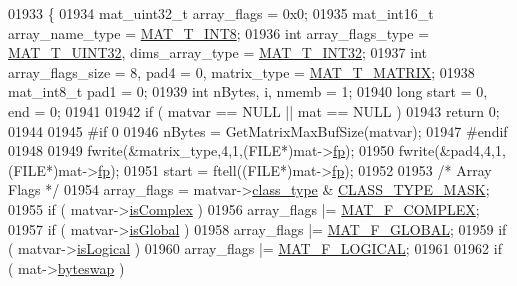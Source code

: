 \begin{DoxyCode}
{{{{{{{{{{{{{{{{01933 \{
01934     mat\_uint32\_t array\_flags = 0x0;
01935     mat\_int16\_t  array\_name\_type = \hyperlink{group___m_a_t_ggacf7b3b879282b7ab3a51190e49bf3453a9807f5033ed4f9b548953742d9fd1658}{MAT\_T\_INT8};
01936     \textcolor{keywordtype}{int}      array\_flags\_type = \hyperlink{group___m_a_t_ggacf7b3b879282b7ab3a51190e49bf3453aa397e285a23fe240368b752897652c6a}{MAT\_T\_UINT32}, dims\_array\_type = 
      \hyperlink{group___m_a_t_ggacf7b3b879282b7ab3a51190e49bf3453a83e06a68320726c6572bfbb9f3addb1d}{MAT\_T\_INT32};
01937     \textcolor{keywordtype}{int}      array\_flags\_size = 8, pad4 = 0, matrix\_type = \hyperlink{group___m_a_t_ggacf7b3b879282b7ab3a51190e49bf3453a32985fee89a4df8db4b3f5d3a48823d3}{MAT\_T\_MATRIX};
01938     mat\_int8\_t   pad1 = 0;
01939     \textcolor{keywordtype}{int}      nBytes, i, nmemb = 1;
01940     \textcolor{keywordtype}{long}     start = 0, end = 0;
01941 
01942     \textcolor{keywordflow}{if} ( matvar == NULL ||  mat == NULL )
01943         \textcolor{keywordflow}{return} 0;
01944 
01945 \textcolor{preprocessor}{#if 0}
01946     nBytes = GetMatrixMaxBufSize(matvar);
01947 \textcolor{preprocessor}{#endif}
01948 
01949     fwrite(&matrix\_type,4,1,(FILE*)mat->\hyperlink{struct__mat__t_a85f562e407ca9ad4d2a6e14f839432b7}{fp});
01950     fwrite(&pad4,4,1,(FILE*)mat->\hyperlink{struct__mat__t_a85f562e407ca9ad4d2a6e14f839432b7}{fp});
01951     start = ftell((FILE*)mat->\hyperlink{struct__mat__t_a85f562e407ca9ad4d2a6e14f839432b7}{fp});
01952 
01953     \textcolor{comment}{/* Array Flags */}
01954     array\_flags = matvar->\hyperlink{group___m_a_t_aff13035bf3265dd7d9425e5d40c839d4}{class\_type} & \hyperlink{mat5_8c_a24b94e17e9c34b9c795798099c710751}{CLASS\_TYPE\_MASK};
01955     \textcolor{keywordflow}{if} ( matvar->\hyperlink{group___m_a_t_aeb03b3a69f108dc05470b00443a43739}{isComplex} )
01956         array\_flags |= \hyperlink{group___m_a_t_ggab9d6ef9e3ddca78a317b173f01d53fbbacd7b091a11184aad7fc6078c04470780}{MAT\_F\_COMPLEX};
01957     \textcolor{keywordflow}{if} ( matvar->\hyperlink{group___m_a_t_af26c71c4c0ddb14931d15910dddac1bc}{isGlobal} )
01958         array\_flags |= \hyperlink{group___m_a_t_ggab9d6ef9e3ddca78a317b173f01d53fbba49084e0c796aa7963e53f7539525d40d}{MAT\_F\_GLOBAL};
01959     \textcolor{keywordflow}{if} ( matvar->\hyperlink{group___m_a_t_a866c1539e68073a837833d74cd4a65be}{isLogical} )
01960         array\_flags |= \hyperlink{group___m_a_t_ggab9d6ef9e3ddca78a317b173f01d53fbba57eb5c6e200bcbc0f1b7982f29a169c2}{MAT\_F\_LOGICAL};
01961 
01962     \textcolor{keywordflow}{if} ( mat->\hyperlink{struct__mat__t_a99d207977af5e04941ace56d71817a40}{byteswap} )
}}}}}}}}}}}}}}}}
\end{DoxyCode}
